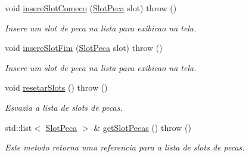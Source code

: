 \begin{DoxyCompactItemize}
void \hyperlink{classEngine_aa1b503d190c6cf01a5f317954cc954eb}{insereSlotComeco} (\hyperlink{classSlotPeca}{SlotPeca} slot)  throw ()
\begin{DoxyCompactList}\small\item\em Insere um slot de peca na lista para exibicao na tela. \item\end{DoxyCompactList}\item 
void \hyperlink{classEngine_a6d4ad083eb125652810bc7f36091d0a3}{insereSlotFim} (\hyperlink{classSlotPeca}{SlotPeca} slot)  throw ()
\begin{DoxyCompactList}\small\item\em Insere um slot de peca na lista para exibicao na tela. \item\end{DoxyCompactList}\item 
\hypertarget{classEngine_a2d85b68730cd1b731febc630d80ff3e0}{
void \hyperlink{classEngine_a2d85b68730cd1b731febc630d80ff3e0}{resetarSlots} ()  throw ()}
\label{classEngine_a2d85b68730cd1b731febc630d80ff3e0}

\begin{DoxyCompactList}\small\item\em Esvazia a lista de slots de pecas. \item\end{DoxyCompactList}\item 
std::list$<$ \hyperlink{classSlotPeca}{SlotPeca} $>$ \& \hyperlink{classEngine_a26fd5a5381537312c47f226ff1c59ff0}{getSlotPecas} ()  throw ()
\begin{DoxyCompactList}\small\item\em Este metodo retorna uma referencia para a lista de slots de pecas. \item\end{DoxyCompactList}\end{DoxyCompactItemize}
